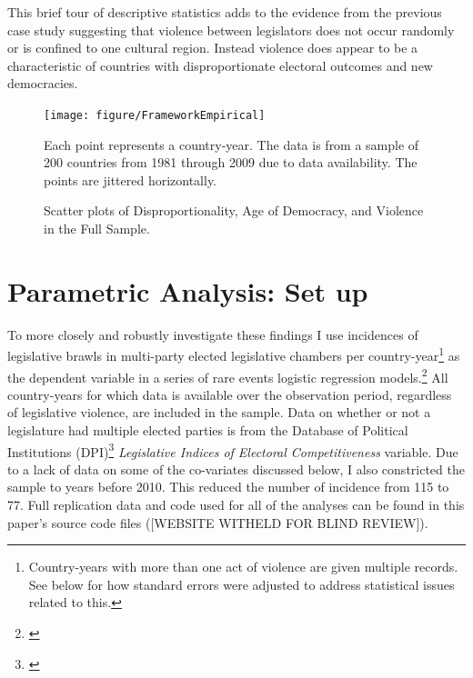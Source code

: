 \documentclass[a4paper]{article}\usepackage[]{graphicx}\usepackage[]{color}
\newenvironment{knitrout}{}{} %
\begin{document}
This brief tour of descriptive statistics adds to the evidence from the previous case study suggesting that violence between legislators does not occur randomly or is confined to one cultural region. Instead violence does appear to be a characteristic of countries with disproportionate electoral outcomes and new democracies.

\begin{figure}[t]
    \caption{Scatter plots of Disproportionality, Age of Democracy, and Violence in the Full Sample.}  
    \label{framework_empirical}
    \begin{center}

\begin{knitrout}
\color{fgcolor}
\texttt{[image: figure/FrameworkEmpirical]} 

\end{knitrout}

    \end{center}
    \begin{singlespace}
        {\scriptsize{Each point represents a country-year. The data is from a sample of 200 countries from 1981 through 2009 due to data availability. The points are jittered horizontally.}}
    \end{singlespace}

\end{figure}




\section{Parametric Analysis: Set up}

To more closely and robustly investigate these findings I use incidences of legislative brawls in multi-party elected legislative chambers per country-year\footnote{Country-years with more than one act of violence are given multiple records. See below for how standard errors were adjusted to address statistical issues related to this.} as the dependent variable in a series of rare events logistic regression models.\footnote{\citealt{KingRareEvents2001, KingRareEventsPA2001}} All country-years for which data is available over the observation period, regardless of legislative violence, are included in the sample. Data on whether or not a legislature had multiple elected parties is from the Database of Political Institutions (DPI)\footnote{\citealt[updated to 2010]{DPI2001}} {\emph{Legislative Indices of Electoral Competitiveness}} variable. Due to a lack of data on some of the co-variates discussed below, I also constricted the sample to years before 2010. This reduced the number of incidence from 115 to 77. Full replication data and code used for all of the analyses can be found in this paper's source code files ([WEBSITE WITHELD FOR BLIND REVIEW]).
\end{document}
